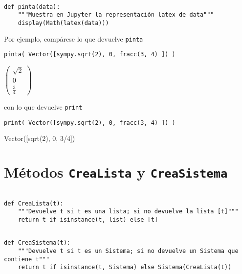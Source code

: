 \documentclass[11pt]{report}
\begin{document}
\begin{verbatim}

def pinta(data):
    """Muestra en Jupyter la representación latex de data"""
    display(Math(latex(data)))

\end{verbatim}

Por ejemplo, compárese lo que devuelve \texttt{pinta}

\begin{verbatim}
pinta( Vector([sympy.sqrt(2), 0, fracc(3, 4) ]) )
\end{verbatim}

\(\displaystyle \begin{pmatrix}\sqrt{2}\\ 0\\ \frac{3}{4}\end{pmatrix}\)

con lo que devuelve \texttt{print}

\begin{verbatim}
print( Vector([sympy.sqrt(2), 0, fracc(3, 4) ]) ) 
\end{verbatim}

Vector([sqrt(2), 0, 3/4])

\section{Métodos \texttt{CreaLista} y \texttt{CreaSistema}}
\label{sec:orga51f2e6}

\begin{verbatim}

def CreaLista(t):
    """Devuelve t si t es una lista; si no devuelve la lista [t]"""
    return t if isinstance(t, list) else [t]

\end{verbatim}

\begin{verbatim}

def CreaSistema(t):
    """Devuelve t si t es un Sistema; si no devuelve un Sistema que contiene t"""
    return t if isinstance(t, Sistema) else Sistema(CreaLista(t))

\end{verbatim}
\end{document}
